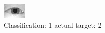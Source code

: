 \begin{figure}[h!]
\begin{center}
\includegraphics[width=0.60\columnwidth]{figures/ID882_class_1_target_2.png}
\end{center}
\caption{ Classification: 1 actual target: 2}
\label{fig:ID882_class_1_target_2}
\end{figure}
